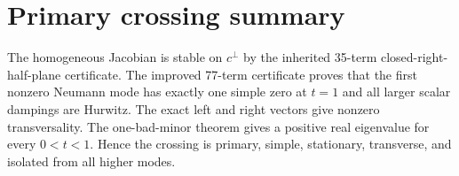 \section*{Primary crossing summary}
The homogeneous Jacobian is stable on $c^\perp$ by the inherited 35-term
closed-right-half-plane certificate.  The improved 77-term certificate proves
that the first nonzero Neumann mode has exactly one simple zero at $t=1$ and
all larger scalar dampings are Hurwitz.  The exact left and right vectors give
nonzero transversality.  The one-bad-minor theorem gives a positive real
eigenvalue for every $0<t<1$.  Hence the crossing is primary, simple,
stationary, transverse, and isolated from all higher modes.
